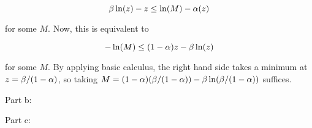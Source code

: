 \documentclass[a4paper,12pt]{article}
\begin{document}
\begin{displaymath}
\beta \ln(z) - z \leq \ln(M) - \alpha(z)
\end{displaymath}

for some $M$. Now, this is equivalent to 

\begin{displaymath}
- \ln(M) \leq (1-\alpha)z - \beta \ln(z)
\end{displaymath}

for some $M$. By applying basic calculus, the right hand side takes a minimum at $z = \beta / (1-\alpha)$, so taking $M = (1-\alpha)(\beta / (1-\alpha)) - \beta \ln(\beta / (1-\alpha))$ suffices. 

\shunt

Part b:

\shunt

Part c:

\shunt
\end{document}
